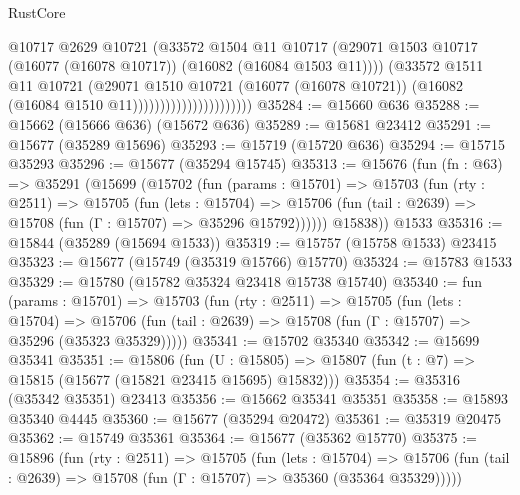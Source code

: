 \begin{lexlean}{RustCore}
\begin{coremodule}
                                        @10717
                                        @2629
                                        @10721
                                        (@33572
                                          @1504
                                          @11
                                          @10717
                                          (@29071
                                            @1503
                                            @10717
                                            (@16077 (@16078 @10717))
                                            (@16082 (@16084 @1503 @11))))
                                        (@33572
                                          @1511
                                          @11
                                          @10721
                                          (@29071
                                            @1510
                                            @10721
                                            (@16077 (@16078 @10721))
                                            (@16082 (@16084 @1510 @11))))))))))))))))))))))
@35284 := @15660 @636
@35288 := @15662 (@15666 @636) (@15672 @636)
@35289 := @15681 @23412
@35291 := @15677 (@35289 @15696)
@35293 := @15719 (@15720 @636)
@35294 := @15715 @35293
@35296 := @15677 (@35294 @15745)
@35313 := @15676
    (fun (fn : @63) =>
    @35291
      (@15699
        (@15702
          (fun (params : @15701) =>
          @15703
            (fun (rty : @2511) =>
            @15705
              (fun (lets : @15704) =>
              @15706 (fun (tail : @2639) => @15708 (fun (Γ : @15707) => @35296 @15792))))))
        @15838))
    @1533
@35316 := @15844 (@35289 (@15694 @1533))
@35319 := @15757 (@15758 @1533) @23415
@35323 := @15677 (@15749 (@35319 @15766) @15770)
@35324 := @15783 @1533
@35329 := @15780 (@15782 @35324 @23418 @15738 @15740)
@35340 := fun (params : @15701) =>
  @15703
    (fun (rty : @2511) =>
    @15705
      (fun (lets : @15704) =>
      @15706 (fun (tail : @2639) => @15708 (fun (Γ : @15707) => @35296 (@35323 @35329)))))
@35341 := @15702 @35340
@35342 := @15699 @35341
@35351 := @15806
    (fun (U : @15805) => @15807 (fun (t : @7) => @15815 (@15677 (@15821 @23415 @15695) @15832)))
@35354 := @35316 (@35342 @35351) @23413
@35356 := @15662 @35341 @35351
@35358 := @15893 @35340 @4445
@35360 := @15677 (@35294 @20472)
@35361 := @35319 @20475
@35362 := @15749 @35361
@35364 := @15677 (@35362 @15770)
@35375 := @15896
    (fun (rty : @2511) =>
    @15705
      (fun (lets : @15704) =>
      @15706 (fun (tail : @2639) => @15708 (fun (Γ : @15707) => @35360 (@35364 @35329)))))

\end{coremodule}
\end{lexlean}
